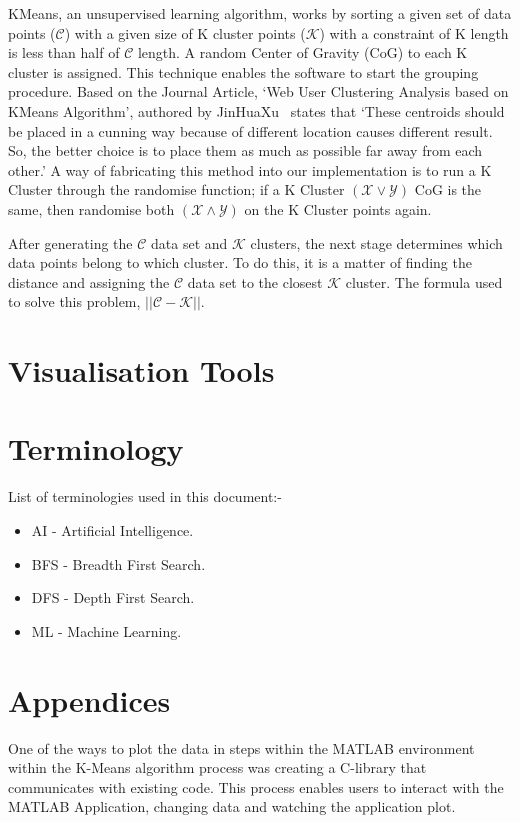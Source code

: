 \documentclass[conference]{IEEEtran}
\begin{document}
      KMeans, an unsupervised learning algorithm, works by sorting a given set of data points ($\mathcal{C}$) with a given size of K cluster points ($\mathcal{K}$) with a constraint of K length is less than half of $\mathcal{C}$ length. A random Center of Gravity (CoG) to each K cluster is assigned. This technique enables the software to start the grouping procedure. Based on the Journal Article, `Web User Clustering Analysis based on KMeans Algorithm', authored by JinHuaXu~\cite{jinhuaxu_web_2010} states that `These centroids should be placed in a cunning way because of different location causes different result. So, the better choice is to place them as much as possible far away from each other.' A way of fabricating this method into our implementation is to run a K Cluster through the randomise function; if a K Cluster $(\mathcal{X} \vee \mathcal{Y})$ CoG is the same, then randomise both $(\mathcal{X} \wedge \mathcal{Y})$ on the K Cluster points again.

      After generating the $\mathcal{C}$ data set and $\mathcal{K}$ clusters, the next stage determines which data points belong to which cluster. To do this, it is a matter of finding the distance and assigning the $\mathcal{C}$ data set to the closest $\mathcal{K}$ cluster. The formula used to solve this problem, $\left||\mathcal{C} - \mathcal{K}\right||$. 

    \section{Visualisation Tools}

    \section{Terminology}
      List of terminologies used in this document:-
      \begin{itemize}
        \item AI - Artificial Intelligence.
        \item BFS - Breadth First Search.
        \item DFS - Depth First Search.
        \item ML - Machine Learning.
      \end{itemize}

    \section{Appendices}
      One of the ways to plot the data in steps within the MATLAB environment within the K-Means algorithm process was creating a C-library that communicates with existing code. This process enables users to interact with the MATLAB Application, changing data and watching the application plot. 
      
\end{document}
